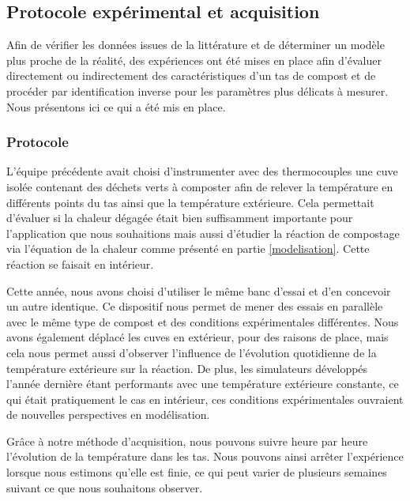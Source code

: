 \documentclass[../PS6_RapportFinal.tex]{subfiles}
\begin{document}
\graphicspath{{img/}{tex/img/}}
\subsection{Protocole expérimental et acquisition}

Afin de vérifier les données issues de la littérature et de déterminer un modèle plus proche de la réalité, des expériences ont été mises en place afin d'évaluer directement ou indirectement des caractéristiques d'un tas de compost et de procéder par identification inverse pour les paramètres plus délicats à mesurer. Nous présentons ici ce qui a été mis en place.


\subsubsection{Protocole}

L'équipe précédente avait choisi d'instrumenter avec des thermocouples une cuve isolée contenant des déchets verts à composter afin de relever la température en différents points du tas ainsi que la température extérieure. Cela permettait d'évaluer si la chaleur dégagée était bien suffisamment importante pour l'application que nous souhaitions mais aussi d'étudier la réaction de compostage via l'équation de la chaleur comme présenté en partie \ref{modelisation}. Cette réaction se faisait en intérieur.

Cette année, nous avons choisi d'utiliser le même banc d'essai et d'en concevoir un autre identique. Ce dispositif nous permet de mener des essais en parallèle avec le même type de compost et des conditions expérimentales différentes. Nous avons également déplacé les cuves en extérieur, pour des raisons de place, mais cela nous permet aussi d'observer l'influence de l'évolution quotidienne de la température extérieure sur la réaction. De plus, les simulateurs développés l'année dernière étant performants avec une température extérieure constante, ce qui était pratiquement le cas en intérieur, ces conditions expérimentales ouvraient de nouvelles perspectives en modélisation.


Grâce à notre méthode d'acquisition, nous pouvons suivre heure par heure l'évolution de la température dans les tas. Nous pouvons ainsi arrêter l'expérience lorsque nous estimons qu'elle est finie, ce qui peut varier de plusieurs semaines suivant ce que nous souhaitons observer.
\end{document}
